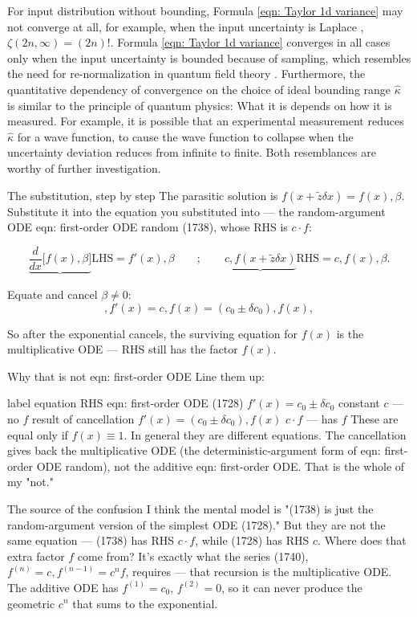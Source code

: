 \documentclass[twoside]{article}
\numberwithin{equation}{section}
\begin{document}
For input distribution without bounding, Formula \eqref{eqn: Taylor 1d variance} may not converge at all, for example, when the input uncertainty is Laplace \cite{Probability_Statistics}, $\zeta(2n, \infty) = (2n)!$.
Formula \eqref{eqn: Taylor 1d variance} converges in all cases only when the input uncertainty is bounded because of sampling, which resembles the need for re-normalization in quantum field theory \cite{Quantum Field}.
Furthermore, the quantitative dependency of convergence on the choice of ideal bounding range $\hat{\kappa}$ is similar to the principle of quantum physics: What it is depends on how it is measured.
For example, it is possible that an experimental measurement reduces $\hat{\kappa}$ for a wave function, to cause the wave function to collapse when the uncertainty deviation reduces from infinite to finite.
Both resemblances are worthy of further investigation.

The substitution, step by step
The parasitic solution is $f(x+\tilde z\delta x)=f(x),\beta$. Substitute it into the equation you substituted into — the random-argument ODE eqn: first-order ODE random (1738), whose RHS is $c\cdot f$:

$$\underbrace{\frac{d}{dx}\big[f(x),\beta\big]}{\text{LHS}}=f'(x),\beta \qquad;\qquad \underbrace{c,f(x+\tilde z\delta x)}{\text{RHS}}=c,f(x),\beta.$$

Equate and cancel $\beta\neq0$:
$$\boxed{,f'(x)=c,f(x)=(c_0\pm\delta c_0),f(x),}$$

So after the exponential cancels, the surviving equation for $f(x)$ is the multiplicative ODE — RHS still has the factor $f(x)$.

Why that is not eqn: first-order ODE
Line them up:

label	equation	RHS
eqn: first-order ODE (1728)	$f'(x)=c_0\pm\delta c_0$	constant $c$ — no $f$
result of cancellation	$f'(x)=(c_0\pm\delta c_0),f(x)$	$c\cdot f$ — has $f$
These are equal only if $f(x)\equiv 1$. In general they are different equations. The cancellation gives back the multiplicative ODE (the deterministic-argument form of eqn: first-order ODE random), not the additive eqn: first-order ODE. That is the whole of my "not."

The source of the confusion
I think the mental model is "(1738) is just the random-argument version of the simplest ODE (1728)." But they are not the same equation — (1738) has RHS $c\cdot f$, while (1728) has RHS $c$. Where does that extra factor $f$ come from? It's exactly what the series (1740), $f^{(n)}=c,f^{(n-1)}=c^n f$, requires — that recursion is the multiplicative ODE. The additive ODE has $f^{(1)}=c_0$, $f^{(2)}=0$, so it can never produce the geometric $c^n$ that sums to the exponential.
\end{document}
